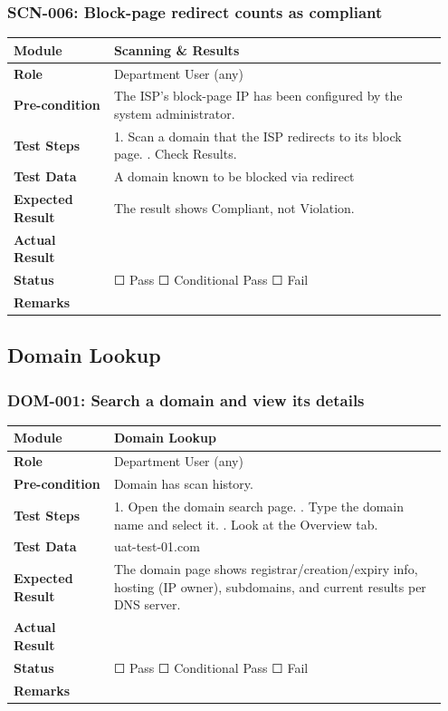 \documentclass[10pt]{article}
\begin{document}
\subsubsection*{SCN-006: Block-page redirect counts as compliant}
\begin{longtable}{p{0.22\linewidth}p{0.73\linewidth}}
\hline
\textbf{Module} & Scanning \& Results \\ \hline
\textbf{Role} & Department User (any) \\ \hline
\textbf{Pre-condition} & The ISP's block-page IP has been configured by the system administrator. \\ \hline
\textbf{Test Steps} & 1. Scan a domain that the ISP redirects to its block page. \newline 2. Check Results. \\ \hline
\textbf{Test Data} & A domain known to be blocked via redirect \\ \hline
\textbf{Expected Result} & The result shows Compliant, not Violation. \\ \hline
\textbf{Actual Result} & \newline \newline \\ \hline
\textbf{Status} & ☐ Pass \quad ☐ Conditional Pass \quad ☐ Fail \\ \hline
\textbf{Remarks} & \newline \\ \hline
\end{longtable}
\subsection{Domain Lookup}
\subsubsection*{DOM-001: Search a domain and view its details}
\begin{longtable}{p{0.22\linewidth}p{0.73\linewidth}}
\hline
\textbf{Module} & Domain Lookup \\ \hline
\textbf{Role} & Department User (any) \\ \hline
\textbf{Pre-condition} & Domain has scan history. \\ \hline
\textbf{Test Steps} & 1. Open the domain search page. \newline 2. Type the domain name and select it. \newline 3. Look at the Overview tab. \\ \hline
\textbf{Test Data} & uat-test-01.com \\ \hline
\textbf{Expected Result} & The domain page shows registrar/creation/expiry info, hosting (IP owner), subdomains, and current results per DNS server. \\ \hline
\textbf{Actual Result} & \newline \newline \\ \hline
\textbf{Status} & ☐ Pass \quad ☐ Conditional Pass \quad ☐ Fail \\ \hline
\textbf{Remarks} & \newline \\ \hline
\end{longtable}
\end{document}
